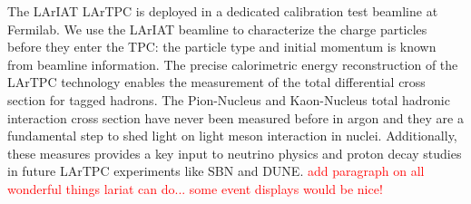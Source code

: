 The LArIAT LArTPC is deployed in a dedicated calibration test beamline at Fermilab.
We use the LArIAT beamline to characterize the charge particles before they enter the TPC: the particle type and initial momentum is known from beamline information. The precise calorimetric energy reconstruction of the LArTPC technology enables the measurement of the total differential cross section for  tagged hadrons. 
The Pion-Nucleus and Kaon-Nucleus total hadronic interaction cross section have never been measured before in argon and they are a fundamental step to shed light on light meson interaction in nuclei. Additionally, these measures provides a key input to neutrino physics and proton decay studies in future LArTPC experiments like SBN and DUNE.
\textcolor{red}{add paragraph on all wonderful things lariat can do... some event displays would be nice!}
